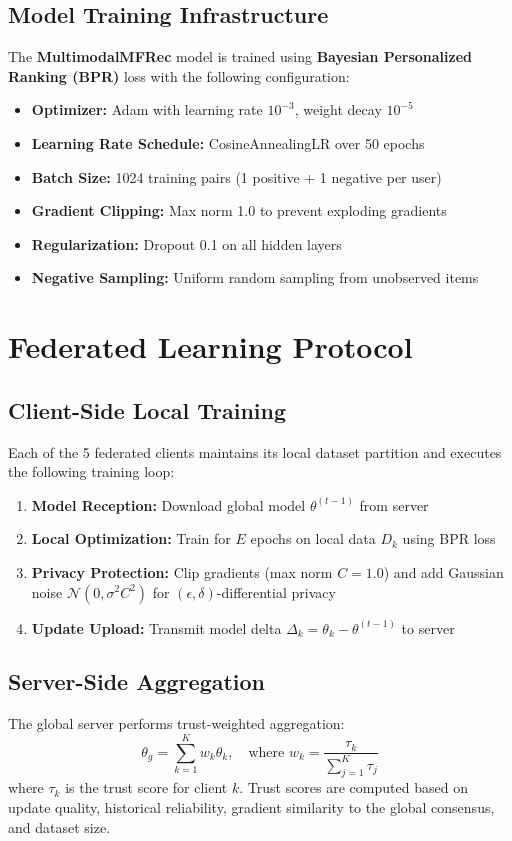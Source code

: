 \documentclass[12pt,a4paper]{report}
\begin{document}
{\subsection{Model Training Infrastructure}
The \textbf{MultimodalMFRec} model is trained using \textbf{Bayesian Personalized Ranking (BPR)} loss with the following configuration:

\begin{itemize}
    \item \textbf{Optimizer:} Adam with learning rate $10^{-3}$, weight decay $10^{-5}$
    \item \textbf{Learning Rate Schedule:} CosineAnnealingLR over 50 epochs
    \item \textbf{Batch Size:} 1024 training pairs (1 positive + 1 negative per user)
    \item \textbf{Gradient Clipping:} Max norm 1.0 to prevent exploding gradients
    \item \textbf{Regularization:} Dropout 0.1 on all hidden layers
    \item \textbf{Negative Sampling:} Uniform random sampling from unobserved items
\end{itemize}

\section{Federated Learning Protocol}
\subsection{Client-Side Local Training}
Each of the 5 federated clients maintains its local dataset partition and executes the following training loop:

\begin{enumerate}
    \item \textbf{Model Reception:} Download global model $\theta^{(t-1)}$ from server
    \item \textbf{Local Optimization:} Train for $E$ epochs on local data $D_k$ using BPR loss
    \item \textbf{Privacy Protection:} Clip gradients (max norm $C=1.0$) and add Gaussian noise $\mathcal{N}(0, \sigma^2 C^2)$ for $(\epsilon, \delta)$-differential privacy
    \item \textbf{Update Upload:} Transmit model delta $\Delta_k = \theta_k - \theta^{(t-1)}$ to server
\end{enumerate}

\subsection{Server-Side Aggregation}
The global server performs trust-weighted aggregation:
\begin{equation}
\theta_{g} = \sum_{k=1}^{K} w_k \theta_k, \quad \text{where } w_k = \frac{\tau_k}{\sum_{j=1}^K \tau_j}
\end{equation}
where $\tau_k$ is the trust score for client $k$. Trust scores are computed based on update quality, historical reliability, gradient similarity to the global consensus, and dataset size.

}
\end{document}
